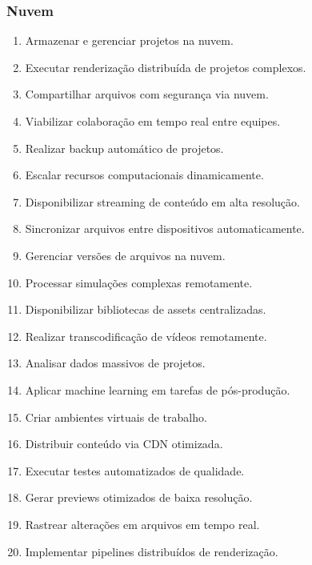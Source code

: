 \subsubsection{Nuvem}
\begin{enumerate}
 \item Armazenar e gerenciar projetos na nuvem.
 \item Executar renderização distribuída de projetos complexos.
 \item Compartilhar arquivos com segurança via nuvem.
 \item Viabilizar colaboração em tempo real entre equipes.
 \item Realizar backup automático de projetos.
 \item Escalar recursos computacionais dinamicamente.
 \item Disponibilizar streaming de conteúdo em alta resolução.
 \item Sincronizar arquivos entre dispositivos automaticamente.
 \item Gerenciar versões de arquivos na nuvem.
 \item Processar simulações complexas remotamente.
 \item Disponibilizar bibliotecas de assets centralizadas.
 \item Realizar transcodificação de vídeos remotamente.
 \item Analisar dados massivos de projetos.
 \item Aplicar machine learning em tarefas de pós-produção.
 \item Criar ambientes virtuais de trabalho.
 \item Distribuir conteúdo via CDN otimizada.
 \item Executar testes automatizados de qualidade.
 \item Gerar previews otimizados de baixa resolução.
 \item Rastrear alterações em arquivos em tempo real.
 \item Implementar pipelines distribuídos de renderização.
\end{enumerate}

